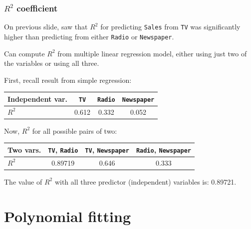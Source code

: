 \documentclass{beamer}
\theoremstyle{example}
\newcommand{\ttt}[1]{{\small\texttt{#1}}}
\begin{document}
\begin{frame}
\frametitle{$R^2$ coefficient}
On previous slide, saw that $R^2$ for predicting \ttt{Sales} from \ttt{TV} was significantly higher than predicting from either \ttt{Radio} or \ttt{Newspaper}. 

\pause
Can compute $R^2$ from multiple linear regression model, either using just two of the variables or using all three. 

First, recall result from simple regression:
\begin{center}
    \begin{tabular}{l c c c}
        Independent var. & \ttt{TV} & \ttt{Radio} & \ttt{Newspaper} \\ 
        \hline 
        $R^2$       &  0.612  &  0.332  &  0.052
    \end{tabular}
\end{center}

\pause
Now, $R^2$ for all possible pairs of two:
\begin{center}
    \begin{tabular}{l c c c}
        Two vars. & \ttt{TV}, \ttt{Radio} & \ttt{TV}, \ttt{Newspaper} & \ttt{Radio}, \ttt{Newspaper} \\ 
        \hline 
        $R^2$       &  0.89719  &  0.646  &  0.333
    \end{tabular}
\end{center}

\pause
The value of $R^2$ with all three predictor (independent) variables is: 0.89721.

\end{frame}

\section{Polynomial fitting}
\end{document}
